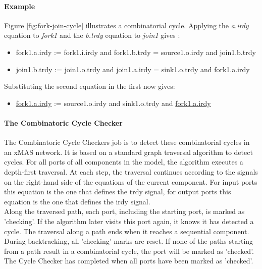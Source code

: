 \documentclass[a4paper,11pt]{article}
\begin{document}
\paragraph{Example}
Figure \ref{fig:fork-join-cycle} illustrates a combinatorial cycle. Applying the \emph{a.irdy} equation
to \emph{fork1} and the \emph{b.trdy} equation to \emph{join1} gives \cite[p.~44]{chatterjee10}:
\begin{itemize}
 \item fork1.a.irdy := fork1.i.irdy and fork1.b.trdy = source1.o.irdy and join1.b.trdy
 \item join1.b.trdy := join1.o.trdy and join1.a.irdy = sink1.o.trdy and fork1.a.irdy
\end{itemize}
Substituting the second equation in the first now gives:
\begin{itemize}
 \item \underline{fork1.a.irdy} := source1.o.irdy and sink1.o.trdy and \underline{fork1.a.irdy}
\end{itemize}







\paragraph{The Combinatoric Cycle Checker}
The Combinatoric Cycle Checkers job is to detect these combinatorial cycles in an xMAS network.
It is based on a standard graph traversal algorithm to detect cycles. For all ports of all
components in the model, the algorithm executes a depth-first traversal. At each step, the
traversal continues according to the signals on the right-hand side of the equations
of the current component. For input ports this equation is the one that defines
the trdy signal, for output ports this equation is the one that defines the irdy signal.\\
Along the traversed path, each port, including the starting port, is marked as 'checking'.
If the algorithm later visits this port again, it knows it has detected a cycle.
The traversal along a path ends when it reaches a sequential component. During backtracking,
all 'checking' marks are reset. If none of the paths starting from a path result in a
combinatorial cycle, the port will be marked as 'checked'. The Cycle Checker has completed
when all ports have been marked as 'checked'.
\end{document}
